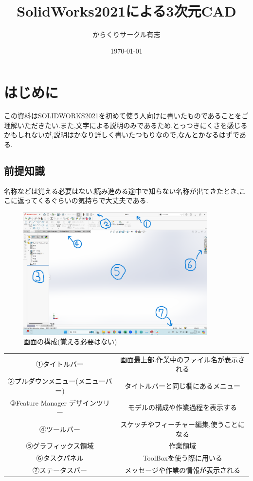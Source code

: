 \documentclass[a4paper,11pt]{jsarticle}
\title{SolidWorks2021による3次元CAD}
\author{からくりサークル有志}
\date{\today}
\begin{document}
\maketitle
\clearpage
\tableofcontents
\clearpage

\section{はじめに}
この資料はSOLIDWORKS2021を初めて使う人向けに書いたものであることをご理解いただきたい.また,文字による説明のみであるため,とっつきにくさを感じるかもしれないが,説明はかなり詳しく書いたつもりなので,なんとかなるはずである.
\subsection{前提知識}
名称などは覚える必要はない.読み進める途中で知らない名称が出てきたとき,ここに返ってくるぐらいの気持ちで大丈夫である.
\begin{figure}[h]
 \begin{center}
  \includegraphics[width=100mm]{solidworks_menu1.png}
  \caption{画面の構成(覚える必要はない)}
 \end{center}
\end{figure}
\begin{table}[h]
\centering
\begin{tabular}[t]{|c|c|}
 ①タイトルバー & 画面最上部.作業中のファイル名が表示される \\
 ②プルダウンメニュー(メニューバー) & タイトルバーと同じ欄にあるメニュー \\
 ③Feature Manager デザインツリー & モデルの構成や作業過程を表示する \\
 ④ツールバー & スケッチやフィーチャー編集,使うことになる \\
 ⑤グラフィックス領域 & 作業領域\\
 ⑥タスクパネル & ToolBoxを使う際に用いる \\
 ⑦ステータスバー & メッセージや作業の情報が表示される \\
\end{tabular}
\end{table}
\clearpage
\end{document}
